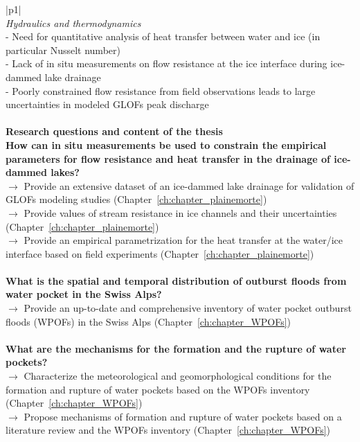 \begin{center}
\begin{longtable}{|p{}|}
\\
\textit{Hydraulics and thermodynamics} \\
\hline
- Need for quantitative analysis of heat transfer between water and ice (in particular Nusselt number) {\citep{Clarke2003,Roberts2005,Bjornsson2010,Sommers&Rajaram2020}} \\
- Lack of in situ measurements on flow resistance at the ice interface during ice-dammed lake drainage {\citep{Clarke2003,Werder&al2010,Vincent&al2010,Kingslake&al2015,Gleason&al2016}} \\
- Poorly constrained flow resistance from field observations leads to large uncertainties in modeled GLOFs peak discharge {\citep{Werder&al2010}} \\
\\
\hline
\textbf{Research questions and content of the thesis} \\
\hline
\textbf{How can in situ measurements be used to constrain the empirical parameters for flow resistance and heat transfer in the drainage of ice-dammed lakes?} \\
$\rightarrow$ Provide an extensive dataset of an ice-dammed lake drainage for validation of GLOFs modeling studies (Chapter~\ref{ch:chapter_plainemorte}) \\
$\rightarrow$ Provide values of stream resistance in ice channels and their uncertainties (Chapter~\ref{ch:chapter_plainemorte}) \\
$\rightarrow$ Provide an empirical parametrization for the heat transfer at the water/ice interface based on field experiments (Chapter~\ref{ch:chapter_plainemorte}) \\
\\
\textbf{What is the spatial and temporal distribution of outburst floods from water pocket in the Swiss Alps?} \\
$\rightarrow$ Provide an up-to-date and comprehensive inventory of water pocket outburst floods (WPOFs) in the Swiss Alps (Chapter~\ref{ch:chapter_WPOFs}) \\
\\
\textbf{What are the mechanisms for the formation and the rupture of water pockets?} \\
$\rightarrow$ Characterize the meteorological and geomorphological conditions for the formation and rupture of water pockets based on the WPOFs inventory (Chapter~\ref{ch:chapter_WPOFs}) \\
$\rightarrow$ Propose mechanisms of formation and rupture of water pockets based on a literature review and the WPOFs inventory (Chapter~\ref{ch:chapter_WPOFs}) \\

\end{longtable}
\end{center}
